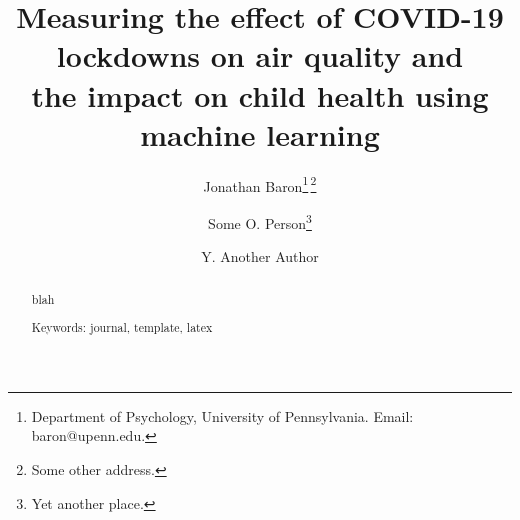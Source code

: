 \documentclass[9pt,twocolumn]{article}
\begin{document}
\sloppy
\title{\Large{\textbf{
Measuring the effect of COVID-19 lockdowns on air quality and\\
the impact on child health using machine learning
}}}

\author{
Jonathan Baron\thanks{Department of Psychology, University of
  Pennsylvania. Email: baron@upenn.edu.}\;\,\thanks{Some other address.}
\and 
  Some O. Person\thanks{Yet another place.} 
\and
  Y. Another Author\footnotemark[2] %
}

\date{} %
\maketitle

\begin{abstract}

blah\smallskip
\noindent

Keywords: journal, template, latex

\end{abstract}

%
%





\end{document}
